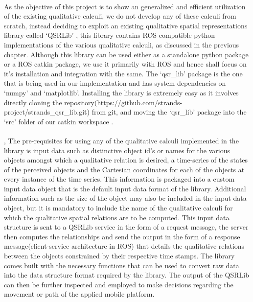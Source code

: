 \paragraph{}As the objective of this project is to show an generalized and efficient utilization of the existing qualitative calculi, we do not develop any of these calculi from scratch, instead deciding to exploit an existing qualitative spatial representations library called `QSRLib' \cite{gatsoulis2016qsrlib}, this library contains ROS compatible  python implementations of the various qualitative calculi, as discussed in the previous chapter. Although this library can be used either as a standalone python package or a ROS catkin package, we use it primarily with ROS and hence shall focus on it's installation and integration with the same. The `qsr\_lib' package is the one that is being used in our implementation and has system dependencies on `numpy' and `matplotlib'. Installing the library is extremely easy as it involves directly cloning the repository(https://github.com/strands-project/strands\_qsr\_lib.git) from git, and moving the `qsr\_lib' package into the `src' folder of our catkin workspace \cite{qsrlib}. 

\paragraph{}\cite{qsrlib}, \cite{gatsoulis2016qsrlib}The pre-requisites for using any of the qualitative calculi implemented in the library is input data such as distinctive object id's or names for the various objects amongst which a qualitative relation is desired, a time-series of the states of the perceived objects and the Cartesian coordinates for each of the objects at every instance of the time series. This information is packaged into a custom input data object that is the default input data format of the library. Additional information such as the size of the object may also be included in the input data object, but it is mandatory to include the name of the qualitative calculi for which the qualitative spatial relations are to be computed. This input data structure is sent to a QSRLib service in the form of a request message, the server then computes the relationships and send the output in the form of a response message(client-service architecture in ROS) that details the qualitative relations between the objects constrained by their respective time stamps. The library comes built with the necessary functions that can be used to convert raw data into the data structure format required by the library. The output of the QSRLib can then be further inspected and employed to make decisions regarding the movement or path of the applied mobile platform.

